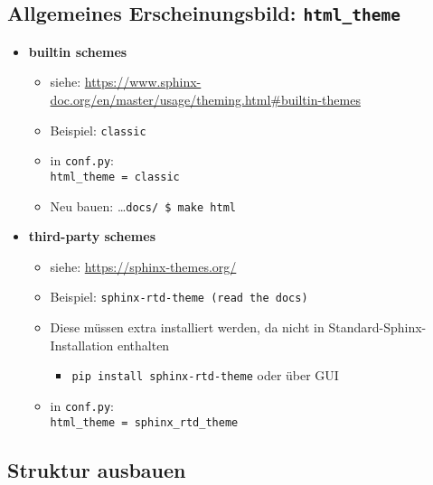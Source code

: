 \hypertarget{allgemeines-erscheinungsbild-html_theme}{%
	\subsection{\texorpdfstring{\textbf{Allgemeines Erscheinungsbild:
				\texttt{html\_theme}}}{Allgemeines Erscheinungsbild: html\_theme}}\label{allgemeines-erscheinungsbild-html_theme}}

\begin{itemize}
	\item
	\textbf{builtin schemes}
	\begin{itemize}
		\item siehe:
		\url{https://www.sphinx-doc.org/en/master/usage/theming.html\#builtin-themes}
		\item
		Beispiel: \texttt{classic}
		\item
		in \texttt{conf.py}:\\ \hspace*{0.5cm}
		\texttt{html\_theme\ =\ \textquotesingle{}classic\textquotesingle{}}
		\item Neu bauen:
		\ldots{}\texttt{docs/\ \$\ make\ html}
	\end{itemize}
	\item
	\textbf{third-party schemes}
	\begin{itemize}
		\item siehe:
		\url{https://sphinx-themes.org/}
		\item
		Beispiel: \texttt{sphinx-rtd-theme\ (read\ the\ docs)}
		\item
		Diese müssen extra installiert werden, da nicht in Standard-Sphinx-Installation
		enthalten
		\begin{itemize}

			\item
			\texttt{pip\ install\ sphinx-rtd-theme} oder über GUI
		\end{itemize}
		\item
		in \texttt{conf.py}:\\ \hspace*{0.5cm}
		\texttt{html\_theme\ =\ \textquotesingle{}sphinx\_rtd\_theme\textquotesingle{}}
	\end{itemize}
\end{itemize}


\subsection{Struktur ausbauen}

